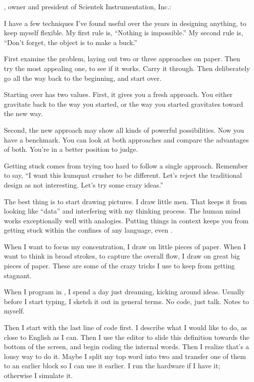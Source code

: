 \begin{interview}
, owner and president of Scientek Instrumentation,
Inc.:

\begin{tfquot}
I have a few techniques I've found useful over the years in designing
anything, to keep myself flexible.
My first rule is, ``Nothing is impossible.''
My second rule is, ``Don't forget, the object is to make a buck.''

First examine the problem, laying out two or three approaches on paper.
Then try the most appealing one, to see if it works. Carry it through. Then
deliberately go all the way back to the beginning, and start over.

Starting over has two values. First, it gives you a fresh approach. You
either gravitate back to the way you started, or the way you started
gravitates toward the new way.

Second, the new approach may show all kinds of powerful possibilities. Now
you have a benchmark. You can look at both approaches and compare the
advantages of both. You're in a better position to judge.

Getting stuck comes from trying too hard to follow a single approach.
Remember to say, ``I want this kumquat crusher to be different. Let's
reject the traditional design as not interesting. Let's try some crazy
ideas.''

The best thing is to start drawing pictures. I draw little men. That keeps
it from looking like ``data'' and interfering with my thinking process. The
human mind works exceptionally well with analogies. Putting things in
context keeps you from getting stuck within the confines of any language,
even \Forth{}.

When I want to focus my concentration, I draw on little pieces of paper.
When I want to think in broad strokes, to capture the overall flow, I draw
on great big pieces of paper. These are some of the crazy tricks I use to keep
from getting stagnant.

When I program in \Forth{}, I spend a day just dreaming, kicking around
ideas. Usually before I start typing, I sketch it out in general terms. No
code, just talk. Notes to myself.

Then I start with the last line of code first. I describe what I would like
to do, as close to English as I can. Then I use the editor to slide this
definition towards the bottom of the screen, and begin coding the internal
words. Then I realize that's a lousy way to do it. Maybe I split my top word
into two and transfer one of them to an earlier block so I can use it earlier.
I run the hardware if I have it; otherwise I simulate it.


\end{tfquot}
\end{interview}
